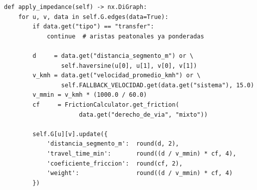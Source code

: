 \begin{lstlisting}[style=estiloPython,
    caption={Inyección del peso de impedancia en cada arista del grafo dirigido.
             \texttt{src/core/models/impedance.py}.},
    label=lst:impedancia]
def apply_impedance(self) -> nx.DiGraph:
    for u, v, data in self.G.edges(data=True):
        if data.get("tipo") == "transfer":
            continue  # aristas peatonales ya ponderadas

        d     = data.get("distancia_segmento_m") or \
                self.haversine(u[0], u[1], v[0], v[1])
        v_kmh = data.get("velocidad_promedio_kmh") or \
                self.FALLBACK_VELOCIDAD.get(data.get("sistema"), 15.0)
        v_mmin = v_kmh * (1000.0 / 60.0)
        cf     = FrictionCalculator.get_friction(
                     data.get("derecho_de_via", "mixto"))

        self.G[u][v].update({
            'distancia_segmento_m':  round(d, 2),
            'travel_time_min':       round((d / v_mmin) * cf, 4),
            'coeficiente_friccion':  round(cf, 2),
            'weight':                round((d / v_mmin) * cf, 4)
        })
\end{lstlisting}
